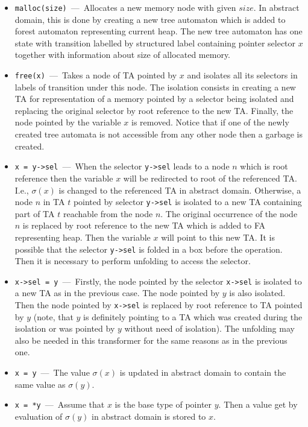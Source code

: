 \documentclass[a4paper, 12pt]{article}
\begin{document}
\begin{itemize}
	\item \texttt{malloc(size)} \,---\, Allocates a new memory node with given $size$.
		In abstract domain, this is done by creating a new tree automaton which
		is added to forest automaton representing current heap.
		The new tree automaton has one state with transition labelled by
		structured label containing pointer selector $x$ together with information
		about size of allocated memory.
	\item \texttt{free(x)} \,---\, Takes a node of TA pointed by $x$ and isolates all
		its selectors in labels of transition under this node.
		The isolation consists in creating a new TA for representation of a memory
		pointed by a selector being isolated and replacing the original selector
		by root reference to the new TA.
		Finally, the node pointed by the variable $x$ is removed.
		Notice that if one of the newly created tree automata is not accessible
		from any other node then a garbage is created.

	\item \texttt{x = y->sel} \,---\, When the selector \texttt{y->sel} leads to a node $n$ which is root
		reference then the variable $x$ will be redirected to root of the referenced TA.
		I.e., $\sigma(x)$ is changed to the referenced TA in abstract domain.
		Otherwise, a node $n$ in TA $t$ pointed by selector \texttt{y->sel} is isolated to a new TA
		containing part of TA $t$ reachable from the node $n$.
		The original occurrence of the node $n$ is replaced by root reference
		to the new TA which is added to FA representing heap.
		Then the variable $x$ will point to this new TA.
		It is possible that the selector \texttt{y->sel} is folded
		in a box before the operation.
		Then it is necessary to perform unfolding to access the selector.
		
	\item \texttt{x->sel = y} \,---\, Firstly, the node pointed by the selector \texttt{x->sel}
		is isolated to a new TA as in the previous case.
		The node pointed by $y$ is also isolated. 
		Then the node pointed by \texttt{x->sel} is replaced
		by root reference to TA pointed by $y$ (note, that
		$y$ is definitely pointing to a TA which was created
		during the isolation or was pointed by $y$ without need of isolation).
		The unfolding may also be needed in this transformer for
		the same reasons as in the previous one.
	
	\item \texttt{x = y} \,---\, The value $\sigma(x)$ is updated in abstract
		domain to contain the same value as $\sigma(y)$.

	\item \texttt{x = *y} \,---\, Assume that $x$ is the base type of pointer $y$.
		Then a value get by evaluation of $\sigma(y)$ in abstract domain is
		stored to $x$.
	
\end{itemize}
\end{document}
